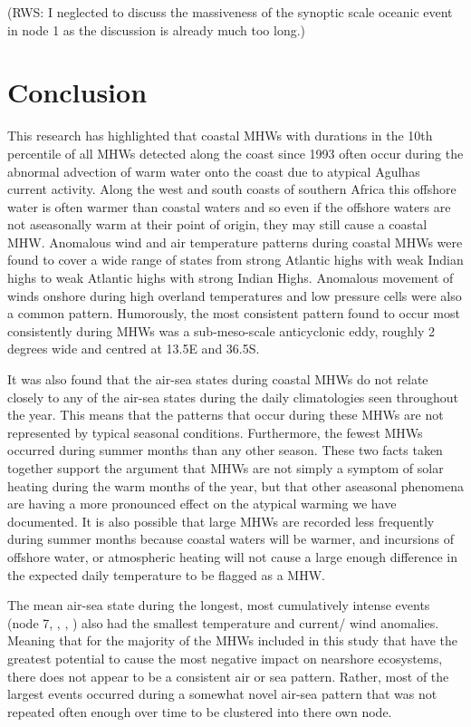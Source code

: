 \documentclass[a4paper,10pt,review]{elsarticle}
\begin{document}
(RWS: I neglected to discuss the massiveness of the synoptic scale oceanic event in node 1 as the discussion is already much too long.)

\section{Conclusion}
This research has highlighted that coastal MHWs with durations in the 10th percentile of all MHWs detected along the coast since 1993 often occur during the abnormal advection of warm water onto the coast due to atypical Agulhas current activity. Along the west and south coasts of southern Africa this offshore water is often warmer than coastal waters and so even if the offshore waters are not aseasonally warm at their point of origin, they may still cause a coastal MHW. Anomalous wind and air temperature patterns during coastal MHWs were found to cover a wide range of states from strong Atlantic highs with weak Indian highs to weak Atlantic highs with strong Indian Highs. Anomalous movement of winds onshore during high overland temperatures and low pressure cells were also a common pattern. Humorously, the most consistent pattern found to occur most consistently during MHWs was a sub-meso-scale anticyclonic eddy, roughly 2 degrees wide and centred at 13.5\degree E and 36.5\degree S.

It was also found that the air-sea states during coastal MHWs do not relate closely to any of the air-sea states during the daily climatologies seen throughout the year. This means that the patterns that occur during these MHWs are not represented by typical seasonal conditions. Furthermore, the fewest MHWs occurred during summer months than any other season. These two facts taken together support the argument that MHWs are not simply a symptom of solar heating during the warm months of the year, but that other aseasonal phenomena are having a more pronounced effect on the atypical warming we have documented. It is also possible that large MHWs are recorded less frequently during summer months because coastal waters will be warmer, and incursions of offshore water, or atmospheric heating will not cause a large enough difference in the expected daily temperature to be flagged as a MHW.

The mean air-sea state during the longest, most cumulatively intense events (node 7, , , ) also had the smallest temperature and current/ wind anomalies. Meaning that for the majority of the MHWs included in this study that have the greatest potential to cause the most negative impact on nearshore ecosystems, there does not appear to be a consistent air or sea pattern. Rather, most of the largest events occurred during a somewhat novel air-sea pattern that was not repeated often enough over time to be clustered into there own node.
\end{document}
